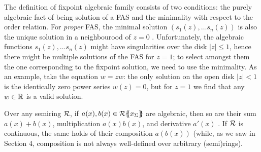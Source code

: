  	\begin{remark}
 		The definition of fixpoint algebraic family consists of two conditions: the purely algebraic fact of being solution of a FAS and the minimality with respect to the order relation. For \emph{proper} FAS, the minimal solution $(s_1(z), \dots s_n(z)) $ is also the unique solution in a neighbourood of $z=0$ \cite{DBLP:books/sp/KuichS86}. Unfortunately, the algebraic functions $s_1(z), \dots s_n(z)$ might have singularities over the disk $|z| \leq 1$, hence there might be multiple solutions of the FAS for $z=1$; to select amongst them the one corresponding to the fixpoint solution, we need to use the minimality. As an example, take the equation $w= zw$: the only solution on the open disk $|z|<1$ is the identically zero power series $w(z)= 0$, but for $z=1$ we find that any $w \in \mathbb{R}$ is a valid solution.
 	\end{remark}
	Over any semiring $\mathcal{R}$, if $a(x),b(x)\in {\mathcal{R}}\{\!\!\{x_\Sigma\}\!\!\}$ are algebraic, then so are their sum $a(x)+b(x)$, multiplication $a(x)b(x)$, and derivative $a'(x)$ \cite{DBLP:series/tmsc/KauersP11}. If $\mathcal{R}$ is continuous, the same holds of their composition $a(b(x))$ (while, as we saw in Section 4, composition is not always well-defined over arbitrary (semi)rings). 


